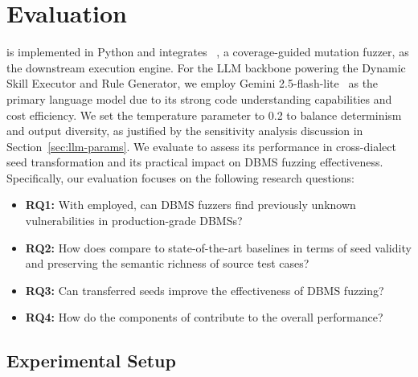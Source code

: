 \documentclass[sigconf,review,anonymous]{acmart}
\begin{document}
\section{Evaluation}
\label{sec:evaluation}

\tool{} is implemented in Python and integrates \griffin{}~\cite{fu2022griffin}, a coverage-guided mutation fuzzer, as the downstream execution engine. For the LLM backbone powering the Dynamic Skill Executor and Rule Generator, we employ Gemini 2.5-flash-lite~\cite{gemini-2.5-flash} as the primary language model due to its strong code understanding capabilities and cost efficiency. We set the temperature parameter to 0.2 to balance determinism and output diversity, as justified by the sensitivity analysis discussion in Section~\ref{sec:llm-params}.
We evaluate \tool{} to assess its performance in cross-dialect seed transformation and its practical impact on DBMS fuzzing effectiveness. Specifically, our evaluation focuses on the following research questions:
\begin{itemize}
    \item \textbf{RQ1:} With \tool{} employed, can DBMS fuzzers find previously unknown vulnerabilities in production-grade DBMSs?
    \item \textbf{RQ2:} How does \tool{} compare to state-of-the-art baselines in terms of seed validity and preserving the semantic richness of source test cases?
    \item \textbf{RQ3:} Can transferred seeds improve the effectiveness of DBMS fuzzing?
    \item \textbf{RQ4:} How do the components of \tool{} contribute to the overall performance?
\end{itemize}

\subsection{Experimental Setup}
\label{sec:setup}

\end{document}
